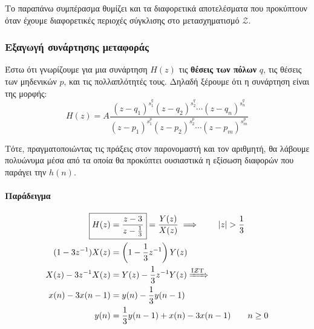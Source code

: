 \documentclass[11pt,a4paper,notitlepage,fleqn,draft]{article}
\begin{document}
Το παραπάνω συμπέρασμα θυμίζει και τα διαφορετικά αποτελέσματα που προκύπτουν όταν έχουμε διαφορετικές περιοχές
σύγκλισης στο μετασχηματισμό \( \mathcal{Z} \).

\subsubsection{Εξαγωγή συνάρτησης μεταφοράς}
Έστω ότι γνωρίζουμε για μια συνάρτηση \( H(z) \) τις \textbf{θέσεις των πόλων } \( q \), τις θέσεις των
μηδενικών \( p \), και τις πολλαπλότητές τους. Δηλαδή ξέρουμε ότι η συνάρτηση είναι της μορφής:
\[
H(z) = A
\frac{(z-q_1)^{s_1^q}(z-q_2)^{s_2^q} \cdots (z-q_n)^{s_n^q} }{(z-p_1)^{s_1^p}(z-p_2)^{s_2^p} \cdots (z-p_m)^{s_m^p}}
\]

Τότε, πραγματοποιώντας τις πράξεις στον παρονομαστή και τον αριθμητή, θα λάβουμε πολυώνυμα μέσα από
τα οποία θα προκύπτει ουσιαστικά η εξίσωση διαφορών που παράγει την \( h(n) \).

\paragraph{Παράδειγμα}
\begin{align*}
	\Aboxed{H(z) &= \frac{z-3}{z-\frac{1}{3}}} = \frac{Y(z)}{X(z)} \implies \qquad |z|>\frac{1}{3}
	\\ (1-3z^{-1})X(z) &= \left(1-\frac{1}{3}z^{-1}\right)Y(z)\\
	X(z) - 3z^{-1}X(z) &= Y(z)-\frac{1}{3}z^{-1} Y(z) \xRightarrow{\text{I}\mathcal{Z}\text{T}} \\
	x(n) - 3x(n-1) &= y(n) - \frac{1}{3}y(n-1) \\
	y(n) &= \frac{1}{3}y(n-1) + x(n) -3x(n-1) \qquad n\geq 0
\end{align*}
\end{document}
